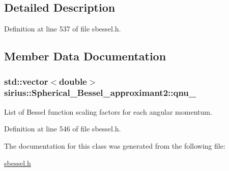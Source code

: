\subsection{Detailed Description}


Definition at line 537 of file sbessel.\+h.



\subsection{Member Data Documentation}
\hypertarget{classsirius_1_1_spherical___bessel__approximant2_a6f53e316d96391172e7e860936a8672f}{}
\subsubsection[{qnu\+\_\+}]{\setlength{\rightskip}{0pt plus 5cm}std\+::vector$<$double$>$ sirius\+::\+Spherical\+\_\+\+Bessel\+\_\+approximant2\+::qnu\+\_\+\hspace{0.3cm}{\ttfamily [private]}}\label{classsirius_1_1_spherical___bessel__approximant2_a6f53e316d96391172e7e860936a8672f}


List of Bessel function scaling factors for each angular momentum. 



Definition at line 546 of file sbessel.\+h.



The documentation for this class was generated from the following file\+:\begin{DoxyCompactItemize}
\item 
\hyperlink{sbessel_8h}{sbessel.\+h}\end{DoxyCompactItemize}
